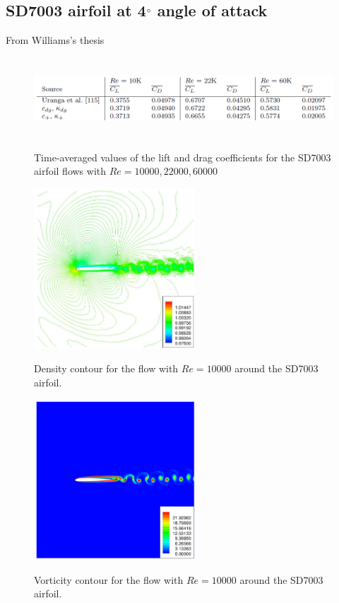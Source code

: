 \graphicspath{{figures_SD7003/}}%

\subsection{SD7003 airfoil at 4$^{\circ}$ angle of attack}
From Williams's thesis\cite{williams2013thesis}

\begin{figure}
\centering
\includegraphics[height=30mm]{table_926} \\
\caption{Time-averaged values of the lift and drag coefficients for the SD7003 airfoil flows with $Re = 10000, 22000, 60000$}
\label{fig:table_926}
\end{figure}

\begin{figure}
\centering
\includegraphics[height=60mm]{figure_935a} \\
\caption{Density contour for the flow with $Re = 10000$ around the SD7003 airfoil.}
\label{fig:figure_935a}
\end{figure}

\begin{figure}
\centering
\includegraphics[height=60mm]{figure_935b} \\
\caption{Vorticity contour for the flow with $Re = 10000$ around the SD7003 airfoil.}
\label{fig:figure_935b}
\end{figure}

